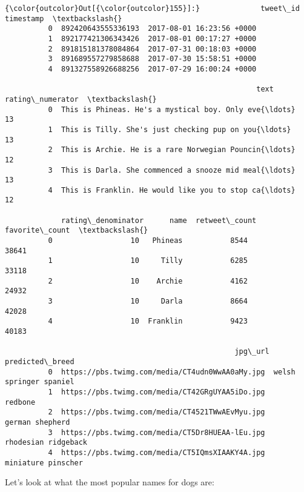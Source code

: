 \documentclass[11pt]{article}
\begin{document}
\begin{Verbatim}[commandchars=\\\{\}]
{\color{outcolor}Out[{\color{outcolor}155}]:}              tweet\_id                  timestamp  \textbackslash{}
          0  892420643555336193  2017-08-01 16:23:56 +0000   
          1  892177421306343426  2017-08-01 00:17:27 +0000   
          2  891815181378084864  2017-07-31 00:18:03 +0000   
          3  891689557279858688  2017-07-30 15:58:51 +0000   
          4  891327558926688256  2017-07-29 16:00:24 +0000   
          
                                                          text  rating\_numerator  \textbackslash{}
          0  This is Phineas. He's a mystical boy. Only eve{\ldots}                13   
          1  This is Tilly. She's just checking pup on you{\ldots}                13   
          2  This is Archie. He is a rare Norwegian Pouncin{\ldots}                12   
          3  This is Darla. She commenced a snooze mid meal{\ldots}                13   
          4  This is Franklin. He would like you to stop ca{\ldots}                12   
          
             rating\_denominator      name  retweet\_count  favorite\_count  \textbackslash{}
          0                  10   Phineas           8544           38641   
          1                  10     Tilly           6285           33118   
          2                  10    Archie           4162           24932   
          3                  10     Darla           8664           42028   
          4                  10  Franklin           9423           40183   
          
                                                     jpg\_url         predicted\_breed  
          0  https://pbs.twimg.com/media/CT4udn0WwAA0aMy.jpg  welsh springer spaniel  
          1  https://pbs.twimg.com/media/CT42GRgUYAA5iDo.jpg                 redbone  
          2  https://pbs.twimg.com/media/CT4521TWwAEvMyu.jpg         german shepherd  
          3  https://pbs.twimg.com/media/CT5Dr8HUEAA-lEu.jpg     rhodesian ridgeback  
          4  https://pbs.twimg.com/media/CT5IQmsXIAAKY4A.jpg      miniature pinscher  
\end{Verbatim}
            
    Let's look at what the most popular names for dogs are:
\end{document}
